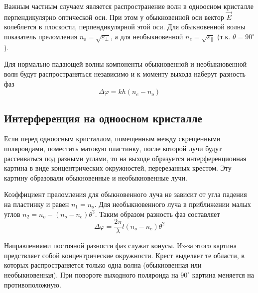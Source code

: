 \begin{figure}[ht!]
\end{figure}
Важным частным случаем является распространение волн в одноосном кристалле перпендикулярно оптической оси. При этом у обыкновенной оси вектор $\vec{E}$ колеблется в плоскости, перпендикулярной этой оси. Для обыкновенной волны показатель преломления $n_{o} = \sqrt{ \varepsilon_{\perp}}$, а для необыкновенной $n_{e} = \sqrt{ \varepsilon_{\parallel}}$ (т.к. $ \theta = 90^{\circ}$).

Для нормально падающей волны компоненты обыкновенной и необыкновенной волн будут распространяться независимо и к моменту выхода наберут разность фаз
\[
    \Delta \varphi = kh\left(n_{e} - n_{o}\right)
\]

\subsection{Интерференция на одноосном кристалле}

Если перед одноосным кристаллом, помещенным между скрещенными поляроидами, поместить матовую пластинку, после которой лучи будут рассеиваться под разными углами, то на выходе образуется интерференционная картина в виде концентрических окружностей, перерезанных крестом. Эту картину образовали обыкновенные и необыкновенные лучи.

Коэффициент преломления для обыкновенного луча не зависит от угла падения на пластинку и равен $n_{1} = n_{o}$. Для необыкновенного луча в приближении малых углов $n_{2} = n_{o} - \left(n_{o} - n_{e}\right) \theta^{2}$. Таким образом разность фаз составляет
\[
    \Delta \varphi = \frac{2 \pi}{ \lambda} l \left(n_{o} - n_{e}\right) \theta^{2}
\]

Направлениями постояной разности фаз служат конусы. Из-за этого картина предствляет собой концентрические окружности. Крест выделяет те области, в которых распространяется только одна волна (обыкновенная или необыкновенная). При повороте выходного поляроида на $90^{\circ}$ картина меняется на противоположную.

